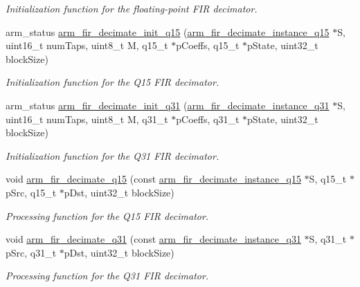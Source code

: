 \begin{DoxyCompactItemize}
\begin{DoxyCompactList}\small\item\em Initialization function for the floating-\/point F\-I\-R decimator. \end{DoxyCompactList}\item 
arm\-\_\-status \hyperlink{group___f_i_r__decimate_gada660e54b93d5d32178c6f5e1c6f368d}{arm\-\_\-fir\-\_\-decimate\-\_\-init\-\_\-q15} (\hyperlink{structarm__fir__decimate__instance__q15}{arm\-\_\-fir\-\_\-decimate\-\_\-instance\-\_\-q15} $\ast$S, uint16\-\_\-t num\-Taps, uint8\-\_\-t M, q15\-\_\-t $\ast$p\-Coeffs, q15\-\_\-t $\ast$p\-State, uint32\-\_\-t block\-Size)
\begin{DoxyCompactList}\small\item\em Initialization function for the Q15 F\-I\-R decimator. \end{DoxyCompactList}\item 
arm\-\_\-status \hyperlink{group___f_i_r__decimate_ga9ed47c4e0f58affa935d84e0508a7f39}{arm\-\_\-fir\-\_\-decimate\-\_\-init\-\_\-q31} (\hyperlink{structarm__fir__decimate__instance__q31}{arm\-\_\-fir\-\_\-decimate\-\_\-instance\-\_\-q31} $\ast$S, uint16\-\_\-t num\-Taps, uint8\-\_\-t M, q31\-\_\-t $\ast$p\-Coeffs, q31\-\_\-t $\ast$p\-State, uint32\-\_\-t block\-Size)
\begin{DoxyCompactList}\small\item\em Initialization function for the Q31 F\-I\-R decimator. \end{DoxyCompactList}\item 
void \hyperlink{group___f_i_r__decimate_gab8bef6d0f6a26fdbfce9485727713ce5}{arm\-\_\-fir\-\_\-decimate\-\_\-q15} (const \hyperlink{structarm__fir__decimate__instance__q15}{arm\-\_\-fir\-\_\-decimate\-\_\-instance\-\_\-q15} $\ast$S, q15\-\_\-t $\ast$p\-Src, q15\-\_\-t $\ast$p\-Dst, uint32\-\_\-t block\-Size)
\begin{DoxyCompactList}\small\item\em Processing function for the Q15 F\-I\-R decimator. \end{DoxyCompactList}\item 
void \hyperlink{group___f_i_r__decimate_gaef8e86add28f15fdc5ecc484e9dd7a4e}{arm\-\_\-fir\-\_\-decimate\-\_\-q31} (const \hyperlink{structarm__fir__decimate__instance__q31}{arm\-\_\-fir\-\_\-decimate\-\_\-instance\-\_\-q31} $\ast$S, q31\-\_\-t $\ast$p\-Src, q31\-\_\-t $\ast$p\-Dst, uint32\-\_\-t block\-Size)
\begin{DoxyCompactList}\small\item\em Processing function for the Q31 F\-I\-R decimator. \end{DoxyCompactList}\end{DoxyCompactItemize}


